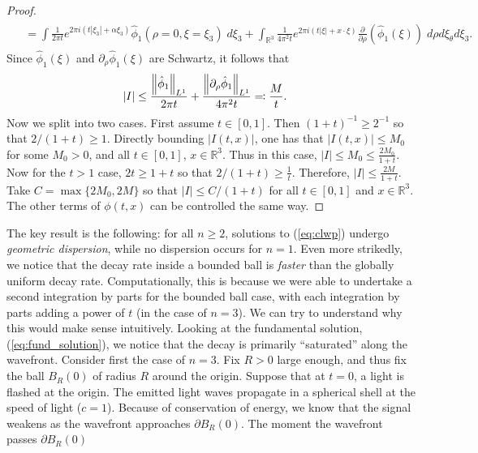 \documentclass{article}
\begin{document}
\begin{proof}
\begin{align*}
\begin{split}
			&= \int \frac{1}{2\pi t}e^{2\pi i (t|\xi_{3}| + \alpha \xi_{3})}\hat{\phi}_{1}(\rho = 0, \xi = \xi_{3})\;d\xi_{3} + \int_{\mathbb{R}^{3}}\frac{1}{4\pi^{2}t}e^{2\pi i (t|\xi| + x \cdot \xi)}\frac{\partial}{\partial \rho}(\hat{\phi}_{1}(\xi))\;d\rho d\xi_{\theta}d\xi_{3}. 	
		\end{split} 
	\end{align*}
	Since $\hat{\phi}_{1}(\xi)$ and $\partial_{\rho}\hat{\phi}_{1}(\xi)$ are Schwartz, it follows that 
	\begin{align*}
		\begin{split}
			|I| &\leq \frac{\left\Vert \hat{\phi}_{1} \right\Vert_{L^{1}}}{2\pi t} + \frac{\left\Vert \partial_{\rho}\hat{\phi}_{1} \right\Vert_{L^{1}}}{4\pi^{2} t} \eqqcolon \frac{M}{t}. 
		\end{split} 
	\end{align*}	
	Now we split into two cases. First assume $t \in [0,1]$. Then $(1 + t)^{-1} \geq 2^{-1}$ so that $2/(1 + t) \geq 1$. Directly bounding $|I(t,x)|$, one has that $|I(t, x)| \leq M_{0}$ for some $M_{0} > 0$, and all $t \in [0,1]$, $x \in \mathbb{R}^{3}$. Thus in this case, $|I| \leq M_{0} \leq \frac{2M_{0}}{1 + t}$. Now for the $t > 1$ case, $2t \geq 1 + t$ so that $2/(1 + t) \geq \frac{1}{t}$. Therefore, $|I| \leq \frac{2M}{1 + t}$. Take $C = \max\{2M_{0}, 2M\}$ so that $|I| \leq C/(1 + t)$ for all $t \in [0,1]$ and $x \in \mathbb{R}^{3}$. The other terms of $\phi(t, x)$ can be controlled the same way. 
\end{proof}

The key result is the following: for all $n \geq 2$, solutions to (\ref{eq:clwp}) undergo \textit{geometric dispersion}, while no dispersion occurs for $n = 1$. Even more strikedly, we notice that the decay rate inside a bounded ball is \textit{faster} than the globally uniform decay rate. Computationally, this is because we were able to undertake a second integration by parts for the bounded ball case, with each integration by parts adding a power of $t$ (in the case of $n =3$). We can try to understand why this would make sense intuitively. Looking at the fundamental solution, (\ref{eq:fund_solution}), we notice that the decay is primarily ``saturated'' along the wavefront. Consider first the case of $n = 3$. Fix $R > 0$ large enough, and thus fix the ball $B_{R}(0)$ of radius $R$ around the origin. Suppose that at $t = 0$, a light is flashed at the origin. The emitted light waves propagate in a spherical shell at the speed of light ($c = 1$). Because of conservation of energy, we know that the signal weakens as the wavefront approaches $\partial B_{R}(0)$. The moment the wavefront passes $\partial B_{R}(0)$ 
\end{document}
